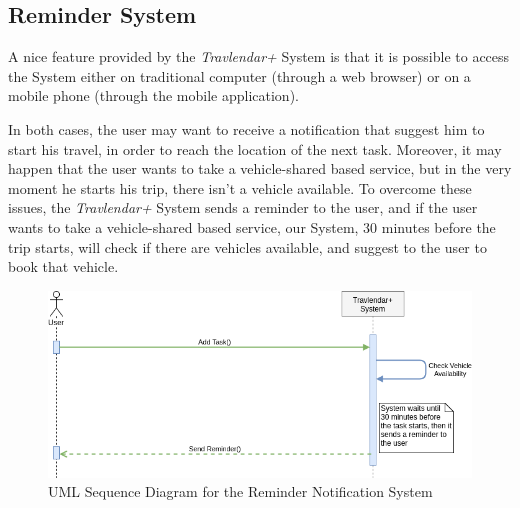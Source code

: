 \subsection{Reminder System}
A nice feature provided by the \emph{Travlendar+} System is that it is possible to access the System either on traditional computer (through a web browser) or on a mobile phone (through the mobile application). 

In both cases, the user may want to receive a notification that suggest him to start his travel, in order to reach the location of the next task. Moreover, it may happen that the user wants to take a vehicle-shared based service, but in the very moment he starts his trip, there isn't a vehicle available. To overcome these issues, the \emph{Travlendar+} System sends a reminder to the user, and if the user wants to take a vehicle-shared based service, our System, 30 minutes before the trip starts, will check if there are vehicles available, and suggest to the user to book that vehicle.

\begin{figure}[H]
\centering
\includegraphics[scale=0.5]{Pictures/SequenceDiagram/reminder.png}
\caption{UML Sequence Diagram for the Reminder Notification System}
\end{figure}